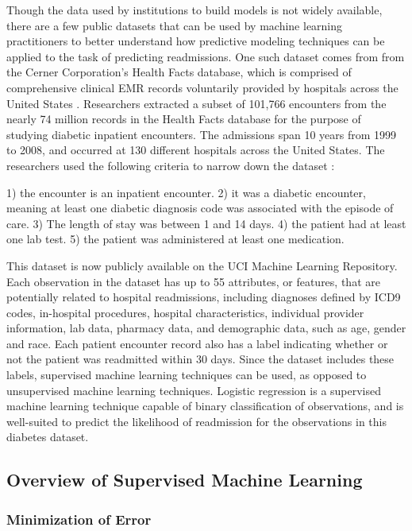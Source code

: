 \documentclass[sigconf]{acmart}
\begin{document}
Though the data used by institutions to build models is not widely available, there are a few public datasets that can be used by machine learning practitioners to better understand how predictive modeling techniques can be applied to the task of predicting readmissions. One such dataset comes from from the Cerner Corporation's Health Facts database, which is comprised of comprehensive clinical EMR records voluntarily provided by hospitals across the United States \cite{cite11}.
Researchers extracted a subset of 101,766 encounters from the nearly 74 million records in the Health Facts database for the purpose of studying diabetic inpatient encounters. The admissions span 10 years from 1999 to 2008, and occurred at 130 different hospitals across the United States. The researchers used the following criteria to narrow down the dataset \cite{cite11}:

1) the encounter is an inpatient encounter.
2) it was a diabetic encounter, meaning at least one diabetic diagnosis code was associated with the episode of care.
3) The length of stay was between 1 and 14 days.
4) the patient had at least one lab test.
5) the patient was administered at least one medication.

This dataset is now publicly available on the UCI Machine Learning Repository. Each observation in the dataset has up to 55 attributes, or features, that are potentially related to hospital readmissions, including diagnoses defined by ICD9 codes, in-hospital procedures, hospital characteristics, individual provider information, lab data, pharmacy data, and demographic data, such as age, gender and race. Each patient encounter record also has a label indicating whether or not the patient was readmitted within 30 days. Since the dataset includes these labels, supervised machine learning techniques can be used, as opposed to unsupervised machine learning techniques. Logistic regression is a supervised machine learning technique capable of binary classification of observations, and is well-suited to predict the likelihood of readmission for the observations in this diabetes dataset.

\subsection{Overview of Supervised Machine Learning}

\subsubsection{Minimization of Error}
\end{document}
